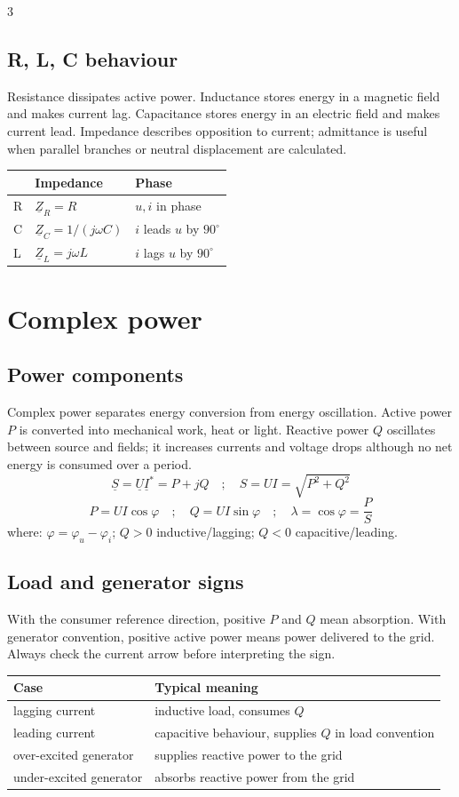 \documentclass[9pt, landscape, a4paper]{article}
\begin{document}
\begin{multicols*}{3}
\subsection{R, L, C behaviour}
Resistance dissipates active power. Inductance stores energy in a magnetic
field and makes current lag. Capacitance stores energy in an electric field and
makes current lead. Impedance describes opposition to current; admittance is
useful when parallel branches or neutral displacement are calculated.

\begin{tabularx}{\columnwidth}{@{}lXX@{}}
  \toprule
  & \textbf{Impedance} & \textbf{Phase}\\
  \midrule
  R & $\underline Z_R=R$ & $u,i$ in phase\\
  C & $\underline Z_C=1/(j\omega C)$ & $i$ leads $u$ by $90^\circ$\\
  L & $\underline Z_L=j\omega L$ & $i$ lags $u$ by $90^\circ$\\
  \bottomrule
\end{tabularx}

\section{Complex power}
\subsection{Power components}
Complex power separates energy conversion from energy oscillation. Active power
$P$ is converted into mechanical work, heat or light. Reactive power $Q$
oscillates between source and fields; it increases currents and voltage drops
although no net energy is consumed over a period.
\[
  \underline S=\underline U\underline I^*=P+jQ
  \quad ; \quad
  S=UI=\sqrt{P^2+Q^2}
\]
\[
  P=UI\cos\varphi
  \quad ; \quad
  Q=UI\sin\varphi
  \quad ; \quad
  \lambda=\cos\varphi=\frac{P}{S}
\]
where: $\varphi=\varphi_u-\varphi_i$; $Q>0$ inductive/lagging; $Q<0$
capacitive/leading.

\subsection{Load and generator signs}
With the consumer reference direction, positive $P$ and $Q$ mean absorption.
With generator convention, positive active power means power delivered to the
grid. Always check the current arrow before interpreting the sign.

\begin{tabularx}{\columnwidth}{@{}lX@{}}
  \toprule
  \textbf{Case} & \textbf{Typical meaning}\\
  \midrule
  lagging current & inductive load, consumes $Q$\\
  leading current & capacitive behaviour, supplies $Q$ in load convention\\
  over-excited generator & supplies reactive power to the grid\\
  under-excited generator & absorbs reactive power from the grid\\
  \bottomrule
\end{tabularx}


\end{multicols*}
\end{document}
